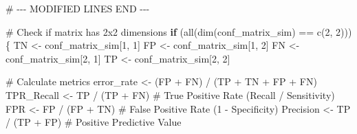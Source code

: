 \documentclass[
  letterpaper,
]{scrbook}
\newenvironment{Shaded}{\begin{snugshade}}{\end{snugshade}}
\newcommand{\CommentTok}[1]{\textcolor[rgb]{0.37,0.37,0.37}{#1}}
\newcommand{\ControlFlowTok}[1]{\textcolor[rgb]{0.00,0.23,0.31}{\textbf{#1}}}
\newcommand{\DecValTok}[1]{\textcolor[rgb]{0.68,0.00,0.00}{#1}}
\newcommand{\FunctionTok}[1]{\textcolor[rgb]{0.28,0.35,0.67}{#1}}
\newcommand{\NormalTok}[1]{\textcolor[rgb]{0.00,0.23,0.31}{#1}}
\newcommand{\OtherTok}[1]{\textcolor[rgb]{0.00,0.23,0.31}{#1}}
\newcommand{\RegionMarkerTok}[1]{\textcolor[rgb]{0.00,0.23,0.31}{#1}}
\newcommand{\SpecialCharTok}[1]{\textcolor[rgb]{0.37,0.37,0.37}{#1}}
\begin{document}
\begin{Shaded}
\begin{Highlighting}[]
\CommentTok{\# {-}{-}{-} MODIFIED LINES }\RegionMarkerTok{END}\CommentTok{ {-}{-}{-}}


\CommentTok{\# Check if matrix has 2x2 dimensions}
\ControlFlowTok{if}\NormalTok{ (}\FunctionTok{all}\NormalTok{(}\FunctionTok{dim}\NormalTok{(conf\_matrix\_sim) }\SpecialCharTok{==} \FunctionTok{c}\NormalTok{(}\DecValTok{2}\NormalTok{, }\DecValTok{2}\NormalTok{))) \{}
\NormalTok{  TN }\OtherTok{\textless{}{-}}\NormalTok{ conf\_matrix\_sim[}\DecValTok{1}\NormalTok{, }\DecValTok{1}\NormalTok{]}
\NormalTok{  FP }\OtherTok{\textless{}{-}}\NormalTok{ conf\_matrix\_sim[}\DecValTok{1}\NormalTok{, }\DecValTok{2}\NormalTok{]}
\NormalTok{  FN }\OtherTok{\textless{}{-}}\NormalTok{ conf\_matrix\_sim[}\DecValTok{2}\NormalTok{, }\DecValTok{1}\NormalTok{]}
\NormalTok{  TP }\OtherTok{\textless{}{-}}\NormalTok{ conf\_matrix\_sim[}\DecValTok{2}\NormalTok{, }\DecValTok{2}\NormalTok{]}

  \CommentTok{\# Calculate metrics}
\NormalTok{  error\_rate }\OtherTok{\textless{}{-}}\NormalTok{ (FP }\SpecialCharTok{+}\NormalTok{ FN) }\SpecialCharTok{/}\NormalTok{ (TP }\SpecialCharTok{+}\NormalTok{ TN }\SpecialCharTok{+}\NormalTok{ FP }\SpecialCharTok{+}\NormalTok{ FN)}
\NormalTok{  TPR\_Recall }\OtherTok{\textless{}{-}}\NormalTok{ TP }\SpecialCharTok{/}\NormalTok{ (TP }\SpecialCharTok{+}\NormalTok{ FN) }\CommentTok{\# True Positive Rate (Recall / Sensitivity)}
\NormalTok{  FPR }\OtherTok{\textless{}{-}}\NormalTok{ FP }\SpecialCharTok{/}\NormalTok{ (FP }\SpecialCharTok{+}\NormalTok{ TN)      }\CommentTok{\# False Positive Rate (1 {-} Specificity)}
\NormalTok{  Precision }\OtherTok{\textless{}{-}}\NormalTok{ TP }\SpecialCharTok{/}\NormalTok{ (TP }\SpecialCharTok{+}\NormalTok{ FP)  }\CommentTok{\# Positive Predictive Value}


\end{Highlighting}
\end{Shaded}
\end{document}

